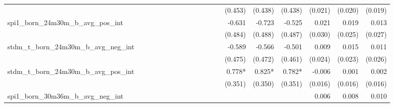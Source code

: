 \begin{tabular}{lrrrrrrrrrrrrrrrrrr}
                                            &              &              &              &              &              &              &              &              &               &              &              &               &      (0.453) &      (0.438) &       (0.438) &      (0.021) &      (0.020) &       (0.019) \\ 
spi1\_born\_24m30m\_b\_avg\_pos\_int        &              &              &              &              &              &              &              &              &               &              &              &               &       -0.631 &       -0.723 &        -0.525 &        0.021 &        0.019 &         0.013 \\ 
                                            &              &              &              &              &              &              &              &              &               &              &              &               &      (0.484) &      (0.488) &       (0.487) &      (0.030) &      (0.025) &       (0.027) \\ 
stdm\_t\_born\_24m30m\_b\_avg\_neg\_int     &              &              &              &              &              &              &              &              &               &              &              &               &       -0.589 &       -0.566 &        -0.501 &        0.009 &        0.015 &         0.011 \\ 
                                            &              &              &              &              &              &              &              &              &               &              &              &               &      (0.475) &      (0.472) &       (0.461) &      (0.024) &      (0.023) &       (0.026) \\ 
stdm\_t\_born\_24m30m\_b\_avg\_pos\_int     &              &              &              &              &              &              &              &              &               &              &              &               &       0.778* &       0.825* &        0.782* &       -0.006 &        0.001 &         0.002 \\ 
                                            &              &              &              &              &              &              &              &              &               &              &              &               &      (0.351) &      (0.350) &       (0.351) &      (0.016) &      (0.016) &       (0.016) \\ 
spi1\_born\_30m36m\_b\_avg\_neg\_int        &              &              &              &              &              &              &              &              &               &              &              &               &              &              &               &        0.006 &        0.008 &         0.010 \\ 

\end{tabular}

